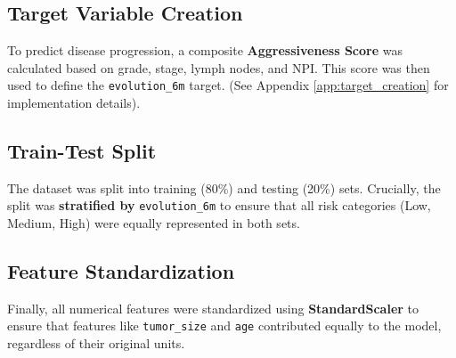 \subsection{Target Variable Creation}
To predict disease progression, a composite \textbf{Aggressiveness Score} was calculated based on grade, stage, lymph nodes, and NPI. This score was then used to define the \texttt{evolution\_6m} target. (See Appendix \ref{app:target_creation} for implementation details).

\subsection{Train-Test Split}
The dataset was split into training (80\%) and testing (20\%) sets. Crucially, the split was \textbf{stratified by} \texttt{evolution\_6m} to ensure that all risk categories (Low, Medium, High) were equally represented in both sets.

\subsection{Feature Standardization}
Finally, all numerical features were standardized using \textbf{StandardScaler} to ensure that features like \texttt{tumor\_size} and \texttt{age} contributed equally to the model, regardless of their original units.
